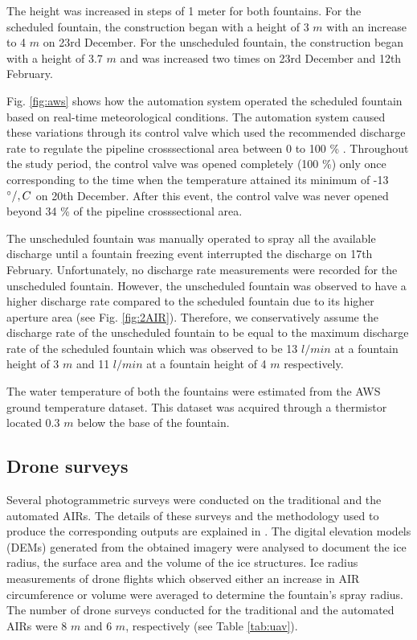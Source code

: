 \documentclass[tc, manuscript]{copernicus}
\begin{document}
The height was increased in steps of 1 meter for both fountains. For the scheduled fountain, the
construction began with a height of 3 $m$ with an increase to 4 $m$ on 23rd December. For the unscheduled
fountain, the construction began with a height of 3.7 $m$ and was increased two times on 23rd December
and 12th February.

Fig. \ref{fig:aws} shows how the automation system operated the scheduled fountain based on real-time
meteorological conditions. The automation system caused these variations through its control valve which used
the recommended discharge rate to regulate the pipeline crosssectional area between 0 to 100 \% . Throughout the
study period, the control valve was opened completely (100 \%) only once corresponding to the time when the
temperature attained its minimum of -13 $^{\circ}/,C$ on 20th December. After this event, the control valve was
never opened beyond 34 \% of the pipeline crosssectional area.  

The unscheduled fountain was manually operated to spray all the available discharge until a fountain freezing
event interrupted the discharge on 17th February. Unfortunately, no discharge rate measurements were recorded
for the unscheduled fountain. However, the unscheduled fountain was observed to have a higher discharge rate
compared to the scheduled fountain due to its higher aperture area (see Fig. \ref{fig:2AIR}). Therefore, we
conservatively assume the discharge rate of the unscheduled fountain to be equal to the maximum discharge rate
of the scheduled fountain which was observed to be 13 $l/min$ at a fountain height of 3 $m$ and 11 $l/min$ at a
fountain height of 4 $m$ respectively.

The water temperature of both the fountains were estimated from the AWS ground temperature dataset. This dataset
was acquired through a thermistor located 0.3 $m$ below the base of the fountain.

\subsection{Drone surveys}

Several photogrammetric surveys were conducted on the traditional and the automated AIRs. The details of these
surveys and the methodology used to produce the corresponding outputs are explained in
\cite{balasubramanianInfluenceMeteorologicalConditions2022}. The digital elevation models (DEMs) generated from
the obtained imagery were analysed to document the ice radius, the surface area and the volume of the ice
structures. Ice radius measurements of drone flights which observed either an increase in AIR circumference or
volume were averaged to determine the fountain's spray radius. The number of drone surveys conducted for the
traditional and the automated AIRs were 8 $m$ and 6 $m$, respectively (see Table \ref{tab:uav}). 
\end{document}
